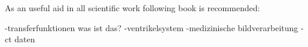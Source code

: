 \chapter{}
\label{sec:Introduction}

As an useful aid in all scientific work following book is recommended: \cite{deininger1992studienarbeiten}


-transferfunktionen was ist das?
-ventrikelsystem
-medizinische bildverarbeitung
-ct daten
